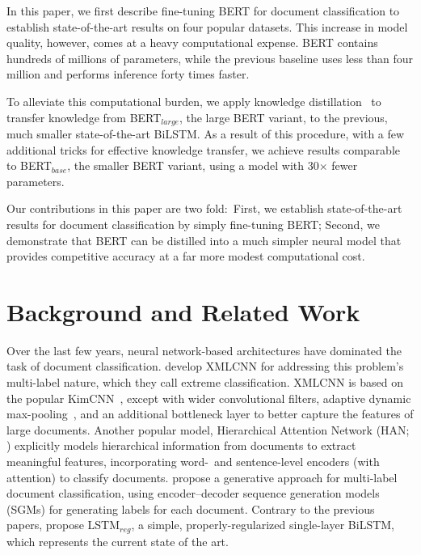 \documentclass[11pt,a4paper]{article}
\newcommand{\BLSTMR}[1]{LSTM$_{reg}$}
\newcommand{\BERTL}[1]{BERT$_{large}$}
\newcommand{\BERTB}[1]{BERT$_{base}$}
\begin{document}
In this paper, we first describe fine-tuning BERT for document classification to establish state-of-the-art results on four popular datasets.
This increase in model quality, however, comes at a heavy computational expense.
BERT contains hundreds of millions of parameters, while the previous baseline uses less than four million and performs inference forty times faster.

To alleviate this computational burden, we apply knowledge distillation~\cite{hintonkd} to transfer knowledge from \BERTL{}, the large BERT variant, to the previous, much smaller state-of-the-art BiLSTM.
As a result of this procedure, with a few additional tricks for effective knowledge transfer, we achieve results comparable to \BERTB{}, the smaller BERT variant, using a model with 30$\times$ fewer parameters.

Our contributions in this paper are two fold:\
First, we establish state-of-the-art results for document classification by simply fine-tuning BERT;
Second, we demonstrate that BERT can be distilled into a much simpler neural model that provides competitive accuracy at a far more modest computational cost.

\section{Background and Related Work}

Over the last few years, neural network-based architectures have dominated the task of document classification.
\citet{liu2017deep} develop XMLCNN for addressing this problem's multi-label nature, which they call extreme classification.
XMLCNN is based on the popular KimCNN~\cite{kim2014convolutional}, except with wider convolutional filters, adaptive dynamic max-pooling~\cite{chendynamicpool, Johnsondynamicpool}, and an additional bottleneck layer to better capture the features of large documents.
Another popular model, Hierarchical Attention Network (HAN; \citealp{yang2016hierarchical}) explicitly models hierarchical information from documents to extract meaningful features, incorporating word-~and sentence-level encoders (with attention) to classify documents.
\citet{yang2018sgm} propose a generative approach for multi-label document classification, using encoder--decoder sequence generation models (SGMs) for generating labels for each document.
Contrary to the previous papers, \citet{adhikari2019rethinking} propose \BLSTMR{}, a simple, properly-regularized single-layer BiLSTM, which represents the current state of the art.
\end{document}
